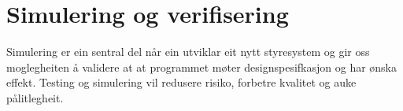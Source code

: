 \chapter{Simulering og verifisering}
\thispagestyle{fancy}

Simulering er ein sentral del når ein utviklar eit nytt styresystem
og gir oss moglegheiten å validere at at programmet møter designspesifkasjon og har ønska effekt.
Testing og simulering vil redusere risiko, forbetre kvalitet og auke pålitlegheit.